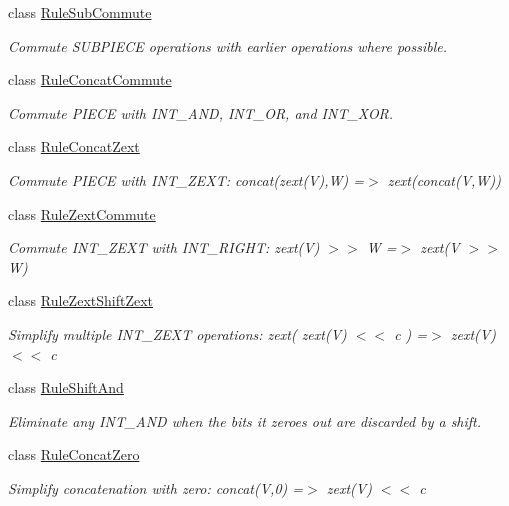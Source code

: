 \begin{DoxyCompactItemize}
class \mbox{\hyperlink{class_rule_sub_commute}{Rule\+Sub\+Commute}}
\begin{DoxyCompactList}\small\item\em Commute S\+U\+B\+P\+I\+E\+CE operations with earlier operations where possible. \end{DoxyCompactList}\item 
class \mbox{\hyperlink{class_rule_concat_commute}{Rule\+Concat\+Commute}}
\begin{DoxyCompactList}\small\item\em Commute P\+I\+E\+CE with I\+N\+T\+\_\+\+A\+ND, I\+N\+T\+\_\+\+OR, and I\+N\+T\+\_\+\+X\+OR. \end{DoxyCompactList}\item 
class \mbox{\hyperlink{class_rule_concat_zext}{Rule\+Concat\+Zext}}
\begin{DoxyCompactList}\small\item\em Commute P\+I\+E\+CE with I\+N\+T\+\_\+\+Z\+E\+XT\+: {\ttfamily concat(zext(\+V),\+W) =$>$ zext(concat(\+V,\+W))} \end{DoxyCompactList}\item 
class \mbox{\hyperlink{class_rule_zext_commute}{Rule\+Zext\+Commute}}
\begin{DoxyCompactList}\small\item\em Commute I\+N\+T\+\_\+\+Z\+E\+XT with I\+N\+T\+\_\+\+R\+I\+G\+HT\+: {\ttfamily zext(\+V) $>$$>$ W =$>$ zext(V $>$$>$ W)} \end{DoxyCompactList}\item 
class \mbox{\hyperlink{class_rule_zext_shift_zext}{Rule\+Zext\+Shift\+Zext}}
\begin{DoxyCompactList}\small\item\em Simplify multiple I\+N\+T\+\_\+\+Z\+E\+XT operations\+: {\ttfamily zext( zext(\+V) $<$$<$ c ) =$>$ zext(\+V) $<$$<$ c} \end{DoxyCompactList}\item 
class \mbox{\hyperlink{class_rule_shift_and}{Rule\+Shift\+And}}
\begin{DoxyCompactList}\small\item\em Eliminate any I\+N\+T\+\_\+\+A\+ND when the bits it zeroes out are discarded by a shift. \end{DoxyCompactList}\item 
class \mbox{\hyperlink{class_rule_concat_zero}{Rule\+Concat\+Zero}}
\begin{DoxyCompactList}\small\item\em Simplify concatenation with zero\+: {\ttfamily concat(\+V,0) =$>$ zext(\+V) $<$$<$ c} \end{DoxyCompactList}\item 

\end{DoxyCompactItemize}
